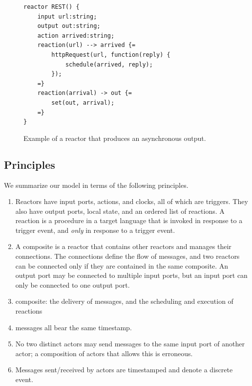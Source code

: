 \documentclass[sigconf]{acmart}
\begin{document}
\begin{figure}[ht]
\begin{lstlisting}[language=LF]
reactor REST() {
	input url:string;
	output out:string;
	action arrived:string;
	reaction(url) --> arrived {=
		httpRequest(url, function(reply) {
			schedule(arrived, reply);
		});
	=}
	reaction(arrival) -> out {=
		set(out, arrival);
	=}
}
\end{lstlisting}
 \caption{Example of a reactor that produces an asynchronous output.}
 \label{fig:async}
\end{figure}

\subsection{Principles}

We summarize our model in terms of the following principles.

\begin{enumerate}
	\item Reactors have input ports, actions, and clocks, all of which are triggers. They also have output ports, local state, and an ordered list of reactions. A reaction is a procedure in a target language that is invoked in response to a trigger event, and \emph{only} in response to a trigger event.
	\item A composite is a reactor that contains other reactors and manages their connections.
	The connections define the flow of messages,
	and two reactors can be connected only if they are contained in the same composite.
	An output port may be connected to multiple input ports, but an input port can only be connected to one output port.
	
	\item composite: the delivery of messages, and the scheduling and execution of reactions
	\item messages all bear the same timestamp.
	\item No two distinct actors may send messages to the same input port of another actor;
	a composition of actors that allows this is erroneous.
	\item Messages sent/received by actors are timestamped and denote a discrete event.
\end{enumerate}
\end{document}
